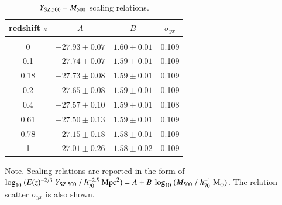 \documentclass[useAMS,usenatbib]{mn2e}
\begin{document}
\begin{table} 
\begin{center}
\caption{$Y_{{\mathrm{SZ}}, 500}-M_{500}$ scaling relations.}
\medskip
\begin{tabular}{cccc}
\hline
\phantom{\Big|}
redshift $z$ & $A$ & $B$ & $\sigma_{yx}$ \\
\hline\\[-0.5em]
 0      & $-27.93\pm0.07$ & $1.60\pm0.01$ & 0.109\\
 0.1   & $-27.74\pm0.07$ & $1.59\pm0.01$ & 0.109\\
 0.18 & $-27.73\pm0.08$ & $1.59\pm0.01$ & 0.109\\
 0.2   & $-27.65\pm0.08$ & $1.59\pm0.01$ & 0.109\\ 
 0.4   & $-27.57\pm0.10$ & $1.59\pm0.01$ & 0.108\\ 
 0.61 & $-27.50\pm0.13$ & $1.59\pm0.01$ & 0.109\\ 
 0.78 & $-27.15\pm0.18$ & $1.58\pm0.01$ & 0.109\\ 
 1      & $-27.01\pm0.26$ & $1.58\pm0.02$ & 0.109\\[0.5em] 
\hline
\end{tabular}
\label{tab:YSZfits}
\end{center}
\footnotesize{Note. Scaling relations are reported in the form of $\log_{10}~(E(z)^{-2/3}~Y_{{\mathrm{SZ}},500}~/~h_{70}^{-2.5}~{\mathrm{Mpc}}^{2})=A+B~\log_{10}~(M_{500}~/~h_{70}^{-1}~{\mathrm{M_{\odot}}})$. The relation scatter $\sigma_{yx}$ is also shown.}
\end{table}
\end{document}
